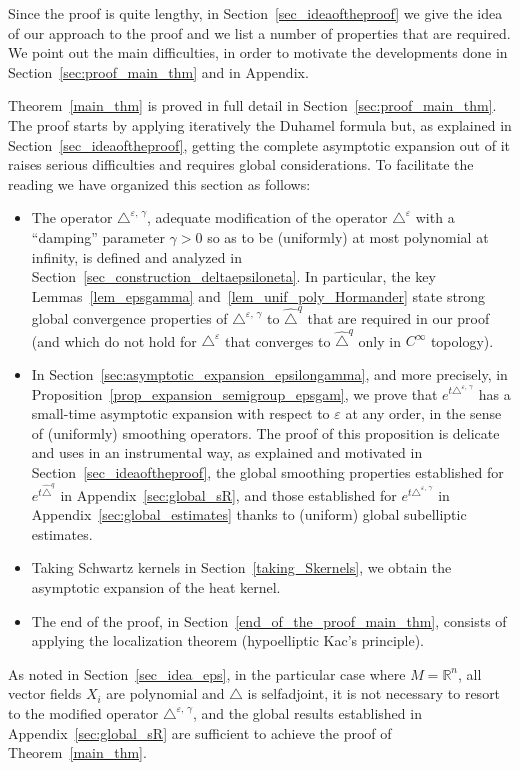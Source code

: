 \documentclass[AHL,Unicode,published]{cedram}
\newcommand*\R{\mathbb{R}}
\begin{document}
Since the proof is quite lengthy, in Section~\ref{sec_ideaoftheproof} we give the idea of our approach to the proof and we list a number of properties that are required. We point out the main difficulties, in order to motivate the developments done in Section~\ref{sec:proof_main_thm} and in Appendix.

Theorem~\ref{main_thm} is proved in full detail in Section~\ref{sec:proof_main_thm}. The proof starts by applying iteratively the Duhamel formula but, as explained in Section~\ref{sec_ideaoftheproof}, getting the complete asymptotic expansion out of it raises serious difficulties and requires global considerations. To facilitate the reading we have organized this section as follows:
\begin{itemize}
\item The operator $\triangle^{\varepsilon,\,\gamma}$, adequate modification of the operator $\triangle^\varepsilon$ with a ``dam\-ping'' parameter $\gamma>0$ so as to be (uniformly) at most polynomial at infinity, is defined and analyzed in Section~\ref{sec_construction_deltaepsiloneta}. In particular, the key Lemmas~\ref{lem_epsgamma} and~\ref{lem_unif_poly_Hormander} state strong global convergence properties of $\triangle^{\varepsilon,\,\gamma}$ to $\widehat{\triangle}^{q}$ that are required in our proof (and which do not hold for $\triangle^\varepsilon$ that converges to $\widehat{\triangle}^{q}$ only in $C^\infty$ topology).
\item In Section~\ref{sec:asymptotic_expansion_epsilongamma}, and more precisely, in Proposition~\ref{prop_expansion_semigroup_epsgam}, we prove that $e^{t\triangle^{\varepsilon,\,\gamma}}$ has a small-time asymptotic expansion with respect to $\varepsilon$ at any order, in the sense of (uniformly) smoothing operators. The proof of this proposition is delicate and uses in an instrumental way, as explained and motivated in Section~\ref{sec_ideaoftheproof}, the global smoothing properties established for $e^{t\widehat{\triangle}^{q}}$ in Appendix~\ref{sec:global_sR}, and those established for $e^{t\triangle^{\varepsilon,\,\gamma}}$ in Appendix~\ref{sec:global_estimates} thanks to (uniform) global subelliptic estimates.
\item Taking Schwartz kernels in Section~\ref{taking_Skernels}, we obtain the asymptotic expansion of the heat kernel.
\item The end of the proof, in Section~\ref{end_of_the_proof_main_thm}, consists of applying the localization theorem (hypoelliptic Kac's principle).
\end{itemize}
As noted in Section~\ref{sec_idea_eps}, in the particular case where $M=\R^n$, all vector fields $X_i$ are polynomial and $\triangle$ is selfadjoint, it is not necessary to resort to the modified operator $\triangle^{\varepsilon,\,\gamma}$, and the global results established in Appendix~\ref{sec:global_sR} are sufficient to achieve the proof of Theorem~\ref{main_thm}.
\end{document}
